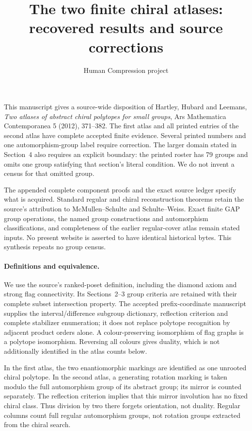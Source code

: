 \documentclass[11pt,a4paper]{article}
\title{The two finite chiral atlases: recovered results and source corrections}
\author{Human Compression project}\date{}
\begin{document}
\maketitle
This manuscript gives a source-wide disposition of Hartley, Hubard and
Leemans, \emph{Two atlases of abstract chiral polytopes for small groups},
Ars Mathematica Contemporanea 5 (2012), 371--382. The first atlas and all
printed entries of the second atlas have complete accepted finite evidence.
Several printed numbers and one automorphism-group label require correction.
The larger domain stated in Section~4 also requires an explicit boundary:
the printed roster has 79 groups and omits one group satisfying that section's
literal condition. We do not invent a census for that omitted group.

The appended complete component proofs and the exact source ledger specify
what is acquired. Standard regular and chiral reconstruction theorems retain
the source's attribution to McMullen--Schulte and Schulte--Weiss. Exact finite
GAP group operations, the named group constructions and automorphism
classifications, and completeness of the earlier regular-cover atlas remain
stated inputs. No present website is asserted to have identical historical
bytes. This synthesis repeats no group census.

\paragraph{Definitions and equivalence.}
We use the source's ranked-poset definition, including the diamond axiom
and strong flag connectivity. Its Sections~2--3 group criteria are retained
with their complete subset intersection property. The accepted prefix-coordinate
manuscript supplies the interval/difference subgroup dictionary, reflection
criterion and complete stabilizer enumeration; it does not replace polytope
recognition by adjacent product orders alone. A colour-preserving isomorphism
of flag graphs is a polytope isomorphism. Reversing all colours gives duality,
which is not additionally identified in the atlas counts below.

In the first atlas, the two enantiomorphic markings are identified as one
unrooted chiral polytope. In the second atlas, a generating rotation marking
is taken modulo the full automorphism group of its abstract group; its mirror
is counted separately. The reflection criterion implies that this mirror
involution has no fixed chiral class. Thus division by two there forgets
orientation, not duality. Regular columns count full regular automorphism
groups, not rotation groups extracted from the chiral search.
\end{document}
